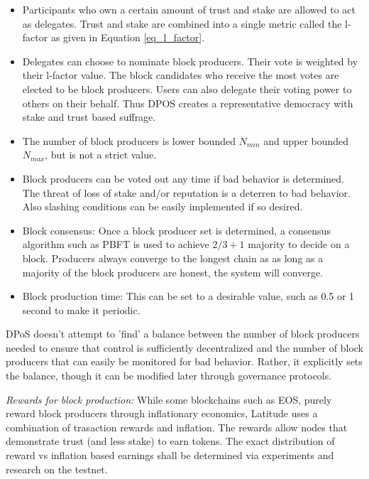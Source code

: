 \begin{itemize}
\item Participants who own a certain amount of trust and stake are allowed to act as delegates. Trust and stake are
    combined into a single metric called the l-factor as given in Equation \ref{eq_l_factor}.
\item Delegates can choose to nominate block producers. Their vote is weighted by their l-factor value. The block
    candidates who receive the most votes are elected to be block producers. Users can also delegate their voting power
        to others on their behalf. Thus DPOS creates a representative democracy with stake and trust based suffrage.
\item The number of block producers is lower bounded $N_{min}$ and upper bounded $N_{max}$, but is not a strict value.

\item Block producers can be voted out any time if bad behavior is determined. The threat of loss of stake and/or
    reputation is a deterren to bad behavior. Also slashing conditions can be easily implemented if so desired.
\item Block consensus: Once a block producer set is determined, a consensus algorithm such as PBFT is used to
    achieve $2/3 +1$ majority to decide on a block. Producers always converge to the longest chain as as long as a
        majority of the block producers are honest, the system will converge.
\item Block production time: This can be set to a desirable value, such as 0.5 or 1 second to make it periodic.
\end{itemize}

DPoS doesn’t attempt to 'find' a balance between the number of block producers needed to ensure that control is
sufficiently decentralized and the number of block producers that can easily be monitored for bad behavior. Rather, it
explicitly sets the balance, though it can be modified later through governance protocols.

\noindent
{\em Rewards for block production:} While some blockchains such as EOS, purely reward block producers through inflationary
economics, Latitude uses a combination of trasaction rewards and inflation. The rewards allow nodes that demonstrate
trust (and less stake) to earn tokens. The exact distribution of reward vs inflation based earnings shall be determined
via experiments and research on the testnet.


